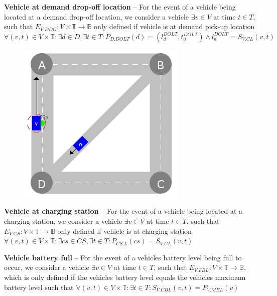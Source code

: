 \documentclass[graybox]{svmult}
\begin{document}
\noindent
\textbf{Vehicle at demand drop-off location}
--
For the event of a vehicle being located at a demand drop-off location, we consider a vehicle $\exists v \in V$ at time $t \in T$, such that 
$E_{V.DDO}: V \times \mathbb{T} \rightarrow \mathbb{B}$ only defined if vehicle is at demand pick-up location $\forall (v,t) \in V \times \mathbb{T}: \exists d \in D, \exists t \in T: P_{D.DOLT}(d) = (l_d^{DOLT},t_d^{DOLT}) \wedge l_d^{DOLT} = S_{V.CL}(v,t)$

\vspace{4mm}

\begin{figure}
	\centering
	\includegraphics[scale=0.35]{../../events/vehicle-at-demand-drop-off.png}
\end{figure}

\noindent
\textbf{Vehicle at charging station}
--
For the event of a vehicle being located at a charging station, we consider a vehicle $\exists v \in V$ at time $t \in T$, such that $E_{V.CS}: V \times \mathbb{T} \rightarrow \mathbb{B}$ only defined if vehicle is at charging station $\forall (v,t) \in V \times \mathbb{T}: \exists cs \in CS, \exists t \in T: P_{CS.L}(cs) = S_{V.CL}(v, t)$

\vspace{4mm}
\noindent
\textbf{Vehicle battery full}
--
For the event of a vehicles battery level being full to occur, we consider a vehicle $\exists v \in V$ at time $t \in T$, such that $E_{V.FBL}: V \times \mathbb{T} \rightarrow \mathbb{B}$, which is only defined if the vehicles battery level equals the vehicles maximum battery level such that $\forall (v,t) \in V \times \mathbb{T}: \exists t \in T: S_{V.CBL}(v,t) = P_{V.MBL}(v)$
\end{document}

